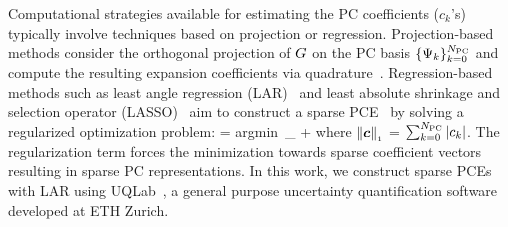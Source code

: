 Computational strategies available for estimating the PC coefficients
($c_k$'s) typically involve techniques based on projection or regression.
Projection-based methods consider the orthogonal projection of 
$G$ on the PC basis $\{\Psi_k\}_{k=0}^{N_\text{PC}}$ and compute
the resulting expansion coefficients via quadrature~\cite{Olivier:2010}.
Regression-based methods such as least angle regression (LAR)~\cite{Efron:2004} and least absolute shrinkage
and selection operator (LASSO)~\cite{Tibshirani:1996} aim to construct a sparse PCE~\cite{Blatman:2008}
by solving a regularized optimization problem:
\be
{} = \mbox{argmin}~_{\bm\theta}
\left[\left(\sum_{k=0}^\Npc c_k \Psi_k(\bm\xi(\bm\theta)) -
\GG^{\mbox{\tiny{M}}}(\bm{\theta})\right)^{2}\right]  + \lambda{}
\ee
where $\left\| {\bm{c}} \right\|_{\scriptscriptstyle 1}$ = $\sum_{k=0}^{N_\text{PC}} |c_k |$.
The regularization term forces the minimization towards sparse coefficient vectors resulting
in sparse PC representations.
In this work, we construct sparse PCEs with LAR using UQLab~\cite{Marelli:2014},
a general purpose uncertainty quantification software developed at ETH Zurich.


















